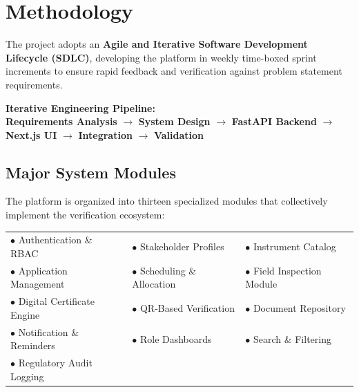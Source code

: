 \documentclass[11pt,a4paper]{article}
\begin{document}
\section{Methodology}
The project adopts an \textbf{Agile and Iterative Software Development Lifecycle (SDLC)}, developing the platform in weekly time-boxed sprint increments to ensure rapid feedback and verification against problem statement requirements.

\begin{center}
\begin{tcolorbox}[enhanced, colback=lightslate, colframe=accentblue, width=0.95\textwidth, arc=2mm]
    \centering
    \textbf{\color{primarynavy}Iterative Engineering Pipeline:}\\
    \small \textbf{Requirements Analysis} $\longrightarrow$ \textbf{System Design} $\longrightarrow$ \textbf{FastAPI Backend} $\longrightarrow$ \textbf{Next.js UI} $\longrightarrow$ \textbf{Integration} $\longrightarrow$ \textbf{Validation}
\end{tcolorbox}
\end{center}

\subsection*{Major System Modules}
The platform is organized into thirteen specialized modules that collectively implement the verification ecosystem:
\begin{center}
\renewcommand{\arraystretch}{1.15}
\begin{tabularx}{\textwidth}{XXX}
    $\bullet$ Authentication \& RBAC & $\bullet$ Stakeholder Profiles & $\bullet$ Instrument Catalog \\
    $\bullet$ Application Management & $\bullet$ Scheduling \& Allocation & $\bullet$ Field Inspection Module \\
    $\bullet$ Digital Certificate Engine & $\bullet$ QR-Based Verification & $\bullet$ Document Repository \\
    $\bullet$ Notification \& Reminders & $\bullet$ Role Dashboards & $\bullet$ Search \& Filtering \\
    $\bullet$ Regulatory Audit Logging & & \\
\end{tabularx}
\end{center}

\end{document}
